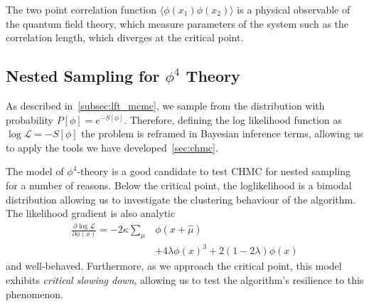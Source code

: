 \documentclass[11pt]{article}
\begin{document}
    The two point correlation function $\langle \phi(x_1) \phi(x_2) \rangle$ is a physical observable of the
    quantum field theory, which measure parameters of the system such as the correlation length,
    which diverges at the critical point.

    \subsection{Nested Sampling for $\phi^4$ Theory}\label{subsec:nested-sampling-phi4}
    As described in~\ref{subsec:lft_mcmc}, we sample from the distribution with probability $P[\phi] = e^{-S[\phi]}$.
    Therefore, defining the log likelihood function as $\log{\mathcal{L}} = -S[\phi]$ the problem is reframed in
    Bayesian inference terms, allowing us to apply the tools we have developed~\ref{sec:chmc}.

    The model of $\phi^4$-theory is a good candidate to test CHMC for nested sampling for a number of reasons.
    Below the critical point, the loglikelihood is a bimodal distribution allowing us to investigate the clustering
    behaviour of the algorithm.
    The likelihood gradient is also analytic
    \begin{equation}\label{eq:grad_likelihood}
    \begin{aligned}
        \frac{\partial \log{\mathcal{L}}} {\partial \phi(x)} = -2\kappa \sum\limits_{\mu} &\phi(x+\hat{\mu}) \\
        &+ 4\lambda \phi(x)^3 + 2(1-2\lambda)\phi(x)
    \end{aligned}
    \end{equation}
    and well-behaved.
    Furthermore, as we approach the critical point, this model exhibits \emph{critical slowing down}, allowing us to
    test the algorithm's resilience to this phenomenon.
\end{document}

